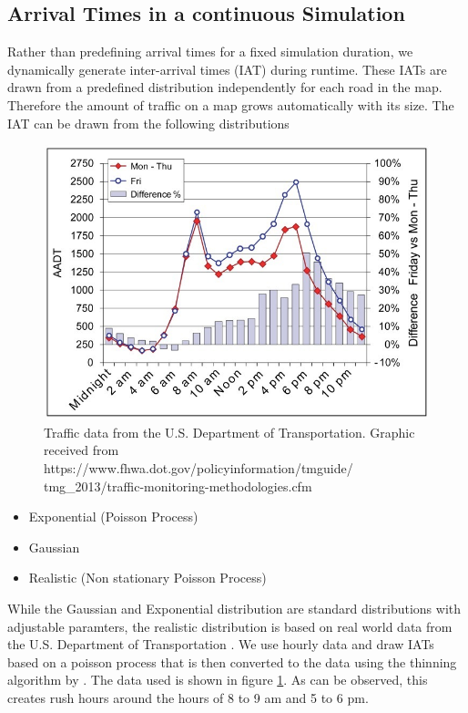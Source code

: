 \documentclass[10pt]{article}
\begin{document}
\subsection{Arrival Times in a continuous Simulation}
Rather than predefining arrival times for a fixed simulation duration, we dynamically generate inter-arrival times (IAT) during runtime. These IATs are drawn from a predefined distribution independently for each road in the map. Therefore the amount of traffic on a map grows automatically with its size. The IAT can be drawn from the following distributions

\begin{figure}[t]
	\includegraphics[width=\linewidth]{img/traffic-data.jpeg}
	\caption{Traffic data from the U.S. Department of Transportation. Graphic received from https://www.fhwa.dot.gov/policyinformation/tmguide/
	tmg\_2013/traffic-monitoring-methodologies.cfm \label{fig:traffic-data}}
\end{figure} 
 
\begin{itemize}
	\item Exponential (Poisson Process)
	\item Gaussian
	\item Realistic (Non stationary Poisson Process)
\end{itemize}
 
 
While the Gaussian and Exponential distribution are standard distributions with adjustable paramters, the realistic distribution is based on real world data from the U.S. Department of Transportation \citep{trafficdata}. We use hourly data and draw IATs based on a poisson process that is then converted to the data using the thinning algorithm by \citet{lewis1979simulation}. The data used is shown in figure \ref{fig:traffic-data}. As can be observed, this creates rush hours around the hours of 8 to 9 am and 5 to 6 pm.
\end{document}
